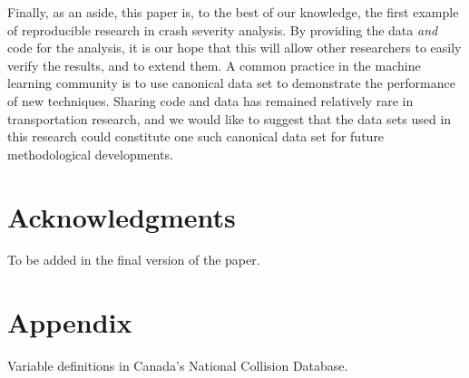 \documentclass[]{elsarticle} %
\begin{document}
Finally, as an aside, this paper is, to the best of our knowledge, the
first example of reproducible research in crash severity analysis. By
providing the data \emph{and} code for the analysis, it is our hope that
this will allow other researchers to easily verify the results, and to
extend them. A common practice in the machine learning community is to
use canonical data set to demonstrate the performance of new techniques.
Sharing code and data has remained relatively rare in transportation
research, and we would like to suggest that the data sets used in this
research could constitute one such canonical data set for future
methodological developments.

\hypertarget{acknowledgments}{%
\section*{Acknowledgments}\label{acknowledgments}}

To be added in the final version of the paper.

\hypertarget{appendix}{%
\section*{Appendix}\label{appendix}}

Variable definitions in Canada's National Collision Database.

\begingroup\fontsize{7}{9}\selectfont
\end{document}

